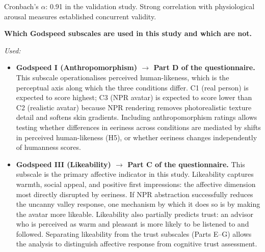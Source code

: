 \documentclass[11pt, a4paper]{article}
\begin{document}
Cronbach's $\alpha$: 0.91 in the validation study. Strong correlation with physiological arousal measures established concurrent validity.

\textbf{Which Godspeed subscales are used in this study and which are not.}

\textit{Used:}
\begin{itemize}[leftmargin=2em]
  \item \textbf{Godspeed I (Anthropomorphism) $\to$ Part D of the questionnaire.} This subscale operationalises perceived human-likeness, which is the perceptual axis along which the three conditions differ. C1 (real person) is expected to score highest; C3 (NPR avatar) is expected to score lower than C2 (realistic avatar) because NPR rendering removes photorealistic texture detail and softens skin gradients. Including anthropomorphism ratings allows testing whether differences in eeriness across conditions are mediated by shifts in perceived human-likeness (H5), or whether eeriness changes independently of humanness scores.
  \item \textbf{Godspeed III (Likeability) $\to$ Part C of the questionnaire.} This subscale is the primary affective indicator in this study. Likeability captures warmth, social appeal, and positive first impressions: the affective dimension most directly disrupted by eeriness. If NPR abstraction successfully reduces the uncanny valley response, one mechanism by which it does so is by making the avatar more likeable. Likeability also partially predicts trust: an advisor who is perceived as warm and pleasant is more likely to be listened to and followed. Separating likeability from the trust subscales (Parts E--G) allows the analysis to distinguish affective response from cognitive trust assessment.
\end{itemize}
\end{document}
